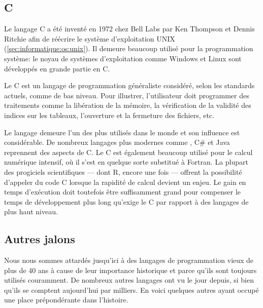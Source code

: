 \subsection{C}
\label{sec:informatique:historique:c}

Le langage C a été inventé en 1972 chez Bell Labs par Ken
Thompson et Dennis Ritchie afin de réécrire le système d'exploitation
UNIX (\autoref{sec:informatique:os:unix}). Il demeure beaucoup utilisé
pour la programmation système: le noyau de systèmes d'exploitation
comme Windows et Linux sont développés en grande partie en C.

Le C est un langage de programmation généraliste considéré, selon les
standards actuels, comme de bas niveau. Pour illustrer, l'utilisateur
doit programmer des traitements comme la libération de la mémoire, la
vérification de la validité des indices sur les tableaux, l'ouverture
et la fermeture des fichiers, etc.

Le langage demeure l'un des plus utilisés dans le monde et son
influence est considérable. De nombreux langages plus modernes comme
\Cpp, C\# et Java reprennent des
aspects de C. Le C est également beaucoup utilisé pour le calcul
numérique intensif, où il s'est en quelque sorte substitué à Fortran.
La plupart des progiciels scientifiques --- dont R, encore une fois
--- offrent la possibilité d'appeler du code C lorsque la rapidité de
calcul devient un enjeu. Le gain en temps d'exécution doit toutefois
être suffisamment grand pour compenser le temps de développement plus
long qu'exige le C par rapport à des langages de plus haut niveau.


\subsection{Autres jalons}
\label{sec:informatique:historique:autres}

Nous nous sommes attardés jusqu'ici à des langages de programmation
vieux de plus de 40 ans à cause de leur importance historique et parce
qu'ils sont toujours utilisés couramment. De nombreux autres langages
ont vu le jour depuis, si bien qu'ils se comptent aujourd'hui par
milliers. En voici quelques autres ayant occupé une place
prépondérante dans l'histoire.

